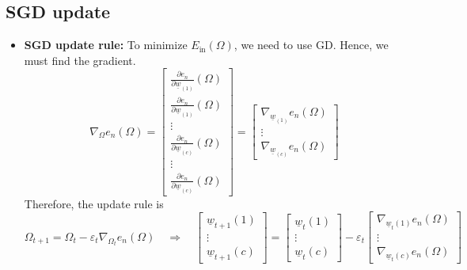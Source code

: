 \subsection{SGD update}
\begin{definition}
    \begin{itemize}
        \item \textbf{SGD update rule:} To minimize \( E_{\text{in}}(\Omega) \), we need to use GD. Hence, we must find the gradient.
        \[
            \nabla_{\Omega} e_n(\Omega) =
            \begin{bmatrix}
                \frac{\partial e_n}{\partial \underline{w}_{(1)}}(\Omega) \\
                \frac{\partial e_n}{\partial \underline{w}_{(1)}}(\Omega) \\
                \vdots \\
                \frac{\partial e_n}{\partial \underline{w}_{(c)}}(\Omega) \\
                \vdots \\
                \frac{\partial e_n}{\partial \underline{w}_{(c)}}(\Omega)
            \end{bmatrix}
            =
            \begin{bmatrix}
                \nabla_{\underline{w}_{(1)}} e_n(\Omega) \\
                \vdots \\
                \nabla_{\underline{w}_{(c)}} e_n(\Omega)
            \end{bmatrix}
        \]
        Therefore, the update rule is
        \[
        \Omega_{t+1} = \Omega_t - \varepsilon_t \nabla_{\Omega_t} e_n(\Omega)
        \quad \Rightarrow \quad
        \begin{bmatrix}
            \underline{w}_{t+1}(1) \\
            \vdots \\
            \underline{w}_{t+1}(c)
        \end{bmatrix}
        =
        \begin{bmatrix}
            \underline{w}_t(1) \\
            \vdots \\
            \underline{w}_t(c)
        \end{bmatrix}
        - \varepsilon_t
        \begin{bmatrix}
            \nabla_{\underline{w}_t(1)} e_n(\Omega) \\
            \vdots \\
            \nabla_{\underline{w}_t(c)} e_n(\Omega)
        \end{bmatrix}
        \]
        

\end{itemize}
\end{definition}
